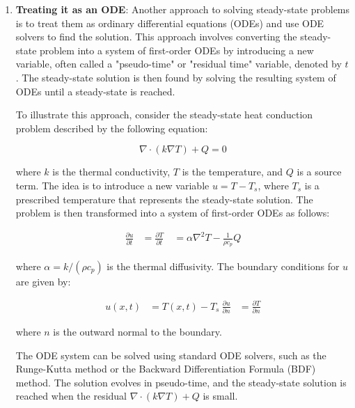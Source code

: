 \begin{enumerate}
  \item \textbf{Treating it as an ODE}:  Another approach to solving steady-state problems is to treat them as ordinary differential equations (ODEs) and use ODE solvers to find the solution. This approach involves converting the steady-state problem into a system of first-order ODEs by introducing a new variable, often called a "pseudo-time" or "residual time" variable, denoted by $t$. The steady-state solution is then found by solving the resulting system of ODEs until a steady-state is reached.

        To illustrate this approach, consider the steady-state heat conduction problem described by the following equation:

        \begin{equation}
          \nabla \cdot (k \nabla T) + Q = 0
        \end{equation}

        where $k$ is the thermal conductivity, $T$ is the temperature, and $Q$ is a source term. The idea is to introduce a new variable $u = T - T_s$, where $T_s$ is a prescribed temperature that represents the steady-state solution. The problem is then transformed into a system of first-order ODEs as follows:

        \begin{align}
          \frac{\partial u}{\partial t} & = \frac{\partial T}{\partial t} \
                                        & = \alpha \nabla^2 T - \frac{1}{\rho c_p} Q
        \end{align}

        where $\alpha = k/(\rho c_p)$ is the thermal diffusivity. The boundary conditions for $u$ are given by:

        \begin{align}
          u(x,t)                        & = T(x,t) - T_s \
          \frac{\partial u}{\partial n} & = \frac{\partial T}{\partial n}
        \end{align}

        where $n$ is the outward normal to the boundary.

        The ODE system can be solved using standard ODE solvers, such as the Runge-Kutta method or the Backward Differentiation Formula (BDF) method. The solution evolves in pseudo-time, and the steady-state solution is reached when the residual $\nabla \cdot (k \nabla T) + Q$ is small.


\end{enumerate}
